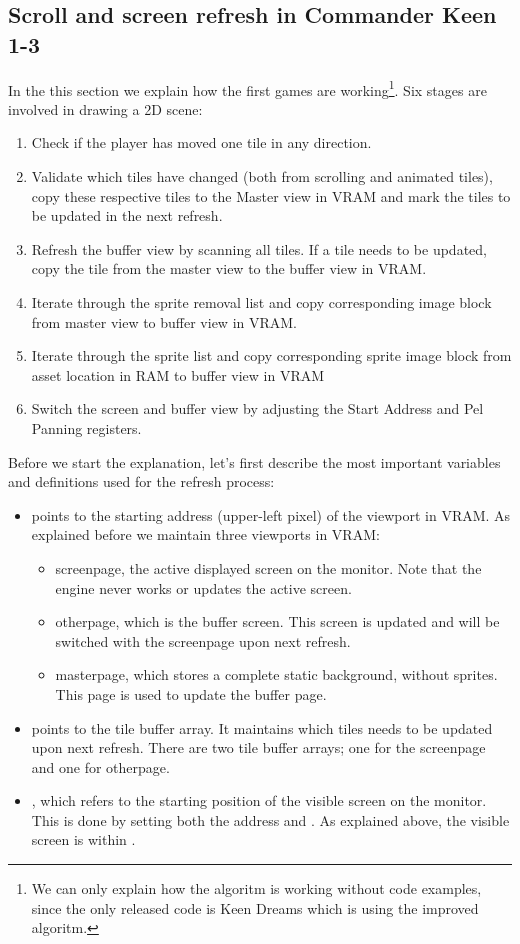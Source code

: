 \documentclass[book.tex]{subfiles}
\begin{document}
\subsection{Scroll and screen refresh in Commander Keen 1-3}
In the this section we explain how the first games are working\footnote{We can only explain how the algoritm is working without code examples, since the only released code is Keen Dreams which is using the improved algoritm.}. Six stages are involved in drawing a 2D scene:
\begin{enumerate}
\item Check if the player has moved one tile in any direction.
\item Validate which tiles have changed (both from scrolling and animated tiles), copy these respective tiles to the Master view in VRAM and mark the tiles to be updated in the next refresh.
\item Refresh the buffer view by scanning all tiles. If a tile needs to be updated, copy the tile from the master view to the buffer view in VRAM.
\item Iterate through the sprite removal list and copy corresponding image block from master view to buffer view in VRAM. 
\item Iterate through the sprite list and copy corresponding sprite image block from asset location in RAM to buffer view in VRAM
\item Switch the screen and buffer view by adjusting the Start Address and Pel Panning registers.
\end{enumerate}

Before we start the explanation, let's first describe the most important variables and definitions used for the refresh process:
\begin{itemize}
  \item {} points to the starting address (upper-left pixel) of the viewport in VRAM. As explained before we maintain three viewports in VRAM:
  \begin{itemize}
    \item screenpage, the active displayed screen on the monitor. Note that the engine never works or updates the active screen.
    \item otherpage, which is the buffer screen. This screen is updated and will be switched with the screenpage upon next refresh.
    \item masterpage, which stores a complete static background, without sprites. This page is used to update the buffer page.
  \end{itemize}
  \item {} points to the tile buffer array. It maintains which tiles needs to be updated upon next refresh. There are two tile buffer arrays; one for the screenpage and one for otherpage.
  \item {}, which refers to the starting position of the visible screen on the monitor. This is done by setting both the  address and . As explained above, the visible screen is within . 
\end{itemize}
\end{document}
